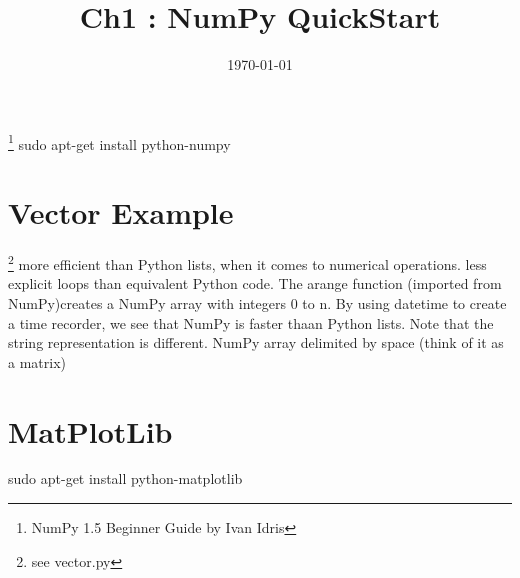\documentclass[12 pt , twoside, letterpaper] {article}
\begin{document}
\title{Ch1 : NumPy QuickStart} 
\date {\today}
\maketitle
\footnote{NumPy 1.5 Beginner Guide by Ivan Idris}
sudo apt-get install python-numpy
\section{Vector Example}\footnote {see vector.py}
 more efficient than Python lists, when it comes to numerical operations.
less explicit loops than equivalent Python code. 
The arange function (imported from NumPy)creates a NumPy array  with integers 0 to n.
By using datetime to create a time recorder, we see that NumPy is faster thaan Python lists. Note that the string representation is different. NumPy array delimited by space (think of it as a matrix)
\section{MatPlotLib}
sudo apt-get install python-matplotlib
\end{document}
